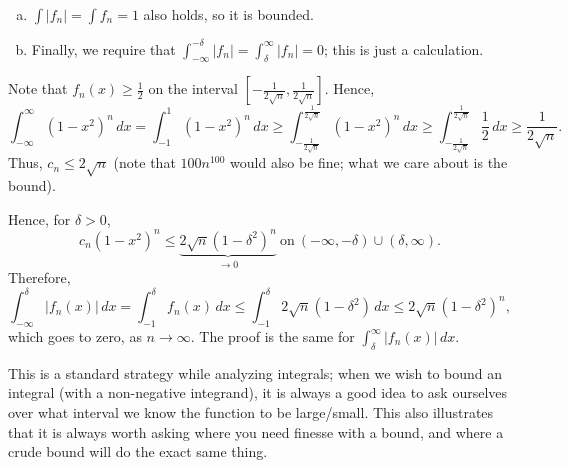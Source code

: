 \begin{example}
\begin{enumerate}[(a)]
		\item \(\displaystyle\int |f_n|=\int f_n=1\) also holds, so it is bounded.
		
		\item Finally, we require that \(\displaystyle\int_{-\infty}^{-\delta} |f_n|=\displaystyle\int_{\delta}^{\infty} |f_n|=0\); this is just a calculation.
	\end{enumerate}
	Note that \(f_n(x)\geq\displaystyle\frac{1}{2}\) on the interval \(\displaystyle\left[-\frac{1}{2\sqrt{n}},\frac{1}{2\sqrt{n}}\right]\). Hence, 
	\begin{equation*}
		\int_{-\infty}^{\infty} (1-x^2)^n \, dx=\int_{-1}^{1} (1-x^2)^n \, dx\geq \int_{-\frac{1}{2\sqrt{n}}}^{\frac{1}{2\sqrt{n}}} (1-x^2)^n \, dx\geq \int_{-\frac{1}{2\sqrt{n}}}^{\frac{1}{2\sqrt{n}}} \frac{1}{2}\, dx\geq \frac{1}{2\sqrt{n}}.
	\end{equation*}
	Thus, \(c_n\leq 2\sqrt{n}\) (note that \(100n^{100}\) would also be fine; what we care about is the bound). 
	
	\medskip
	
	Hence, for \(\delta>0\), 
	\begin{equation*}
		c_n(1-x^2)^n\leq \underbrace{2\sqrt{n}(1-\delta^2)^n}_{\to 0}~\text{on}~(-\infty,-\delta)\cup(\delta,\infty).
	\end{equation*}
	Therefore,
	\begin{equation*}
		\int_{-\infty}^{\delta} |f_n(x)| \, dx=\int_{-1}^{\delta} f_n(x) \, dx\leq \int_{-1}^{\delta} 2\sqrt{n}(1-\delta^2) \, dx\leq 2\sqrt{n}(1-\delta^2)^n,
	\end{equation*}
	which goes to zero, as \(n\to\infty\). The proof is the same for \(\displaystyle\int_{\delta}^{\infty}|f_n(x)| \, dx\).
\end{example}
\begin{note}
	This is a standard strategy while analyzing integrals; when we wish to bound an integral (with a non-negative integrand), it is always a good idea to ask ourselves over what interval we know the function to be large/small. This also illustrates that it is always worth asking where you need finesse with a bound, and where a crude bound will do the exact same thing.
\end{note}

